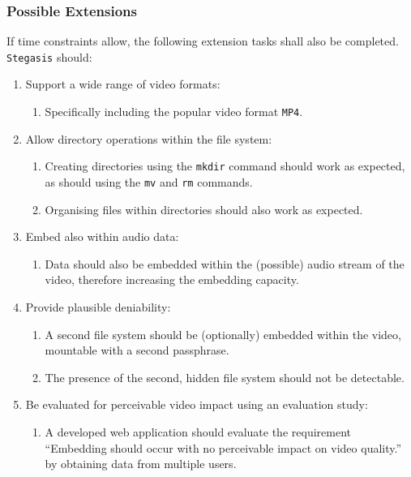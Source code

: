\documentclass[paper=a4, fontsize=11pt,twoside]{scrartcl}
\numberwithin{table}{section}
\numberwithin{figure}{section}
\numberwithin{algorithm}{section}
\begin{document}
\subsubsection{Possible Extensions}

If time constraints allow, the following extension tasks shall also be completed.\\

\noindent
\texttt{Stegasis} should:

\begin{enumerate}
\item Support a wide range of video formats:
	\begin{enumerate}
		\item Specifically including the popular video format \texttt{MP4}.		
	\end{enumerate}
\item Allow directory operations within the file system:
	\begin{enumerate}
		\item Creating directories using the \texttt{mkdir} command should work as expected, as should using the \texttt{mv} and \texttt{rm} commands.
		\item Organising files within directories should also work as expected.
	\end{enumerate}	
\item Embed also within audio data:
	\begin{enumerate}
		\item Data should also be embedded within the (possible) audio stream of the video, therefore increasing the embedding capacity.
	\end{enumerate}	
\item Provide plausible deniability:
	\begin{enumerate}
		\item A second file system should be (optionally) embedded within the video, mountable with a second passphrase.
		\item The presence of the second, hidden file system should not be detectable.
	\end{enumerate}
\item Be evaluated for perceivable video impact using an evaluation study:
	\begin{enumerate}
		\item A developed web application should evaluate the requirement ``Embedding should occur with no perceivable impact on video quality.'' by obtaining data from multiple users.
	\end{enumerate}		
\end{enumerate}
\end{document}
